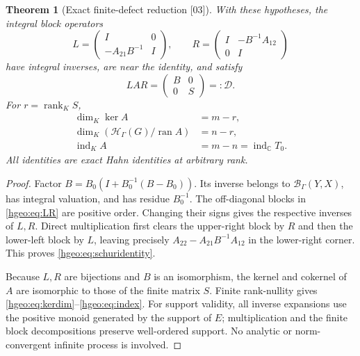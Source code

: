 \documentclass[11pt,letterpaper]{article}
\numberwithin{equation}{section}
\newtheorem{theorem}{Theorem}[section]
\theoremstyle{definition}
\theoremstyle{remark}
\newcommand{\C}{\mathbb C}
\newcommand{\K}{K}
\newcommand{\HH}[1]{\mathscr H_\Gamma(#1)}
\newcommand{\BB}[2]{\mathscr B_\Gamma(#1,#2)}
\newcommand{\ran}{\operatorname{ran}}
\newcommand{\rank}{\operatorname{rank}}
\newcommand{\ind}{\operatorname{ind}}
\newcommand{\src}[1]{\textup{\textsf{\small[#1]}}}
\begin{document}
\begin{theorem}[Exact finite-defect reduction \src{03}]\label{hgeo:thm:schur}
With these hypotheses, the integral block operators
\begin{equation}\label{hgeo:eq:LR}
 L=\begin{pmatrix}I&0\\-A_{21}B^{-1}&I\end{pmatrix},\qquad
 R=\begin{pmatrix}I&-B^{-1}A_{12}\\0&I\end{pmatrix}
\end{equation}
have integral inverses, are near the identity, and satisfy
\begin{equation}\label{hgeo:eq:schuridentity}
 LAR=\begin{pmatrix}B&0\\0&S\end{pmatrix}=:\mathcal D.
\end{equation}
For $r=\rank_\K S$,
\begin{align}
 \dim_\K\ker A&=m-r,\label{hgeo:eq:kerdim}\\
 \dim_\K(\HH{G}/\ran A)&=n-r,\label{hgeo:eq:cokerdim}\\
 \ind_\K A&=m-n=\ind_\C T_0.\label{hgeo:eq:index}
\end{align}
All identities are exact Hahn identities at arbitrary rank.
\end{theorem}
\begin{proof}
Factor $B=B_0(I+B_0^{-1}(B-B_0))$. Its inverse belongs to
$\BB{Y}{X}$, has integral valuation, and has residue $B_0^{-1}$.
The off-diagonal blocks in \eqref{hgeo:eq:LR} are positive order.
Changing their signs gives the respective inverses of $L,R$.
Direct multiplication first clears the upper-right block by $R$
and then the lower-left block by $L$, leaving precisely
$A_{22}-A_{21}B^{-1}A_{12}$ in the lower-right corner. This proves
\eqref{hgeo:eq:schuridentity}.

Because $L,R$ are bijections and $B$ is an isomorphism, the kernel
and cokernel of $A$ are isomorphic to those of the finite matrix $S$.
Finite rank-nullity gives \eqref{hgeo:eq:kerdim}--\eqref{hgeo:eq:index}.
For support validity, all inverse expansions use the positive
monoid generated by the support of $E$; multiplication and the
finite block decompositions preserve well-ordered support. No
analytic or norm-convergent infinite process is involved.
\end{proof}
\end{document}
